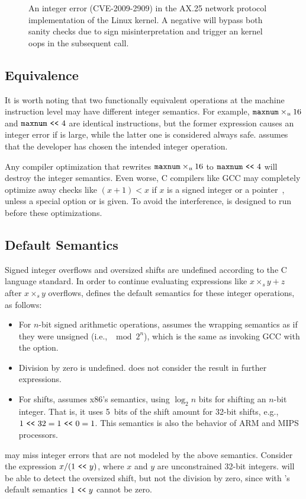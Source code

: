 \begin{figure}
\centering

\vspace{-1em}
\caption{An integer error (CVE-2009-2909) in the AX.25
network protocol implementation of the Linux kernel.  A negative
 will bypass both sanity checks due to sign misinterpretation
 and trigger an kernel
oops in the subsequent  call.}
\label{f:ax25-sign}
\end{figure}

\subsection{Equivalence}
\label{s:sema:eqv}

It is worth noting that two functionally equivalent operations at
the machine instruction level may have different integer semantics.
For example, $\texttt{maxnum}\times_u 16$ and $\texttt{maxnum} \ \texttt{<}\texttt{<}\  4$ are
identical instructions, but the former expression causes an integer
error if  is large, while the latter one is considered
always safe.  \sys assumes that the developer has chosen the
intended integer operation.

Any compiler optimization that rewrites
$\texttt{maxnum}\times_u 16$ to $\texttt{maxnum} \ \texttt{<}\texttt{<}\  4$ will destroy the
integer semantics.  Even worse, C compilers like GCC may completely
optimize away checks like $(x + 1) < x$ if $x$ is a signed integer
or a pointer~\cite{gcc:signed-overflow,us-cert:gcc}, unless a special
option  or  is
given.  To avoid the interference, \sys is designed to run before
these optimizations.

\subsection{Default Semantics}
\label{s:sema:def}

Signed integer overflows and oversized shifts are undefined according
to the C language standard.  In order to continue evaluating
expressions like $x \times_s y + z$ after $x \times_s y$ overflows,
\sys defines the default semantics for these integer operations, as
follows:
\begin{itemize}
\item
For $n$-bit signed arithmetic operations, \sys assumes the wrapping
semantics as if they were unsigned (i.e., $\mod{2^n}$), which is
the same as invoking GCC with the  option.
\item
Division by zero is undefined.  \sys does not consider the result
in further expressions.
\item
For shifts, \sys assumes x86's semantics, using $\log_2 n$ bits for
shifting an $n$-bit integer.  That is, it uses 5~bits of the shift
amount for 32-bit shifts, e.g., $1 \ \texttt{<}\texttt{<}\  32 = 1 \ \texttt{<}\texttt{<}\  0 = 1$.  This semantics
is also the behavior of ARM and MIPS processors.
\end{itemize}
\sys may miss integer errors that are not modeled by the above
semantics.  Consider the expression $x / (1 \ \texttt{<}\texttt{<}\  y)$, where $x$ and
$y$ are unconstrained 32-bit integers.  \sys will be able to detect
the oversized shift, but not the division by zero, since
with \sys's default semantics $1 \ \texttt{<}\texttt{<}\  y$ cannot be zero.

